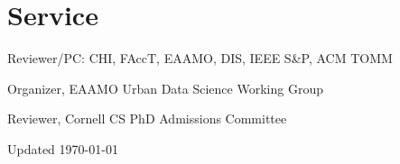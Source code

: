 \documentclass[10pt,letterpaper]{report}
\begin{document}
    \section*{Service}

    \begin{tablist}
        \item[2023--26] \tab{}Reviewer/PC: CHI, FAccT, EAAMO, DIS, IEEE S\&P, ACM TOMM
        \item[2024--] \tab{}Organizer, EAAMO Urban Data Science Working Group
        \item[2025] \tab{}Reviewer, Cornell CS PhD Admissions Committee
    \end{tablist}

    \begin{center}
        \vfill
        Updated \monthyeardate\today
    \end{center}
\end{document}
